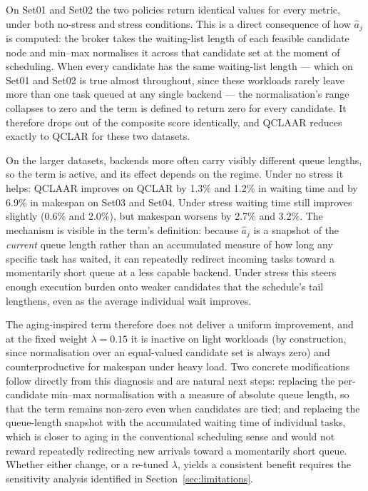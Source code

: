 \documentclass[preprint,12pt]{elsarticle}
\newcommand{\QCLAR}{\textsc{QCLAR}}
\newcommand{\QCLAAR}{\textsc{QCLAAR}}
\begin{document}
On Set01 and Set02 the two policies return identical values for every metric,
under both no-stress and stress conditions. This is a direct consequence of how
$\hat{a}_j$ is computed: the broker takes the waiting-list length of each
feasible candidate node and min--max normalises it across that candidate set at
the moment of scheduling. When every candidate has the same waiting-list length
--- which on Set01 and Set02 is true almost throughout, since these workloads
rarely leave more than one task queued at any single backend --- the
normalisation's range collapses to zero and the term is defined to return zero
for every candidate. It therefore drops out of the composite score identically,
and \QCLAAR{} reduces exactly to \QCLAR{} for these two datasets.

On the larger datasets, backends more often carry visibly different queue
lengths, so the term is active, and its effect depends on the regime. Under no
stress it helps: \QCLAAR{} improves on \QCLAR{} by 1.3\% and 1.2\% in waiting
time and by 6.9\% in makespan on Set03 and Set04. Under stress waiting time
still improves slightly (0.6\% and 2.0\%), but makespan worsens by 2.7\% and
3.2\%. The mechanism is visible in the term's definition: because $\hat{a}_j$
is a snapshot of the \emph{current} queue length rather than an accumulated
measure of how long any specific task has waited, it can repeatedly redirect
incoming tasks toward a momentarily short queue at a less capable backend. Under
stress this steers enough execution burden onto weaker candidates that the
schedule's tail lengthens, even as the average individual wait improves.

The aging-inspired term therefore does not deliver a uniform improvement, and at
the fixed weight $\lambda = 0.15$ it is inactive on light workloads (by
construction, since normalisation over an equal-valued candidate set is always
zero) and counterproductive for makespan under heavy load. Two concrete
modifications follow directly from this diagnosis and are natural next steps:
replacing the per-candidate min--max normalisation with a measure of absolute
queue length, so that the term remains non-zero even when candidates are tied;
and replacing the queue-length snapshot with the accumulated waiting time of
individual tasks, which is closer to aging in the conventional scheduling sense
and would not reward repeatedly redirecting new arrivals toward a momentarily
short queue. Whether either change, or a re-tuned $\lambda$, yields a consistent
benefit requires the sensitivity analysis identified in
Section~\ref{sec:limitations}.
\end{document}
